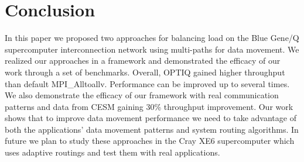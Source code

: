 \section{Conclusion}
\label{sec:conclusion}

In this paper we proposed two approaches for balancing load on the Blue Gene/Q supercomputer interconnection network using multi-paths for data movement. We realized our approaches in a framework and demonstrated the efficacy of our work through a set of benchmarks. Overall, OPTIQ gained higher throughput than default MPI\_Alltoallv. Performance can be improved up to several times. We also demonstrate the efficacy of our framework with real communication patterns and data from CESM gaining 30\% throughput improvement. Our work shows that to improve data movement performance we need to take advantage of both the applications' data movement patterns and system routing algorithms. In future we plan to study these approaches in the Cray XE6 supercomputer which uses adaptive routings and test them with real applications.
